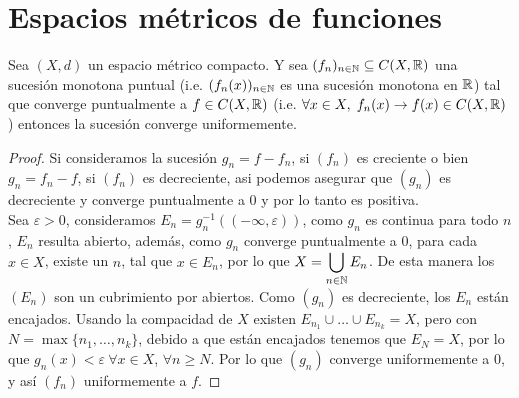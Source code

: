 \documentclass[12pt,a4paper]{book}
\begin{document}
\section{Espacios métricos de funciones}
\begin{teo}
Sea $(X,d)$ un espacio métrico compacto. Y sea $(f_n)_{n\in  \mathbb{N}} \subseteq C(X,\mathbb{R})$ una sucesión monotona puntual (i.e. $(f_n(x))_{n \in \mathbb{N}}$ es una sucesión monotona en $\mathbb{R}$) tal que converge puntualmente a $f \in C(X,\mathbb{R})$ (i.e. $\forall x \in X, \; f_n(x)\rightarrow f(x) \in C(X,\mathbb{R})$) entonces la sucesión converge uniformemente.
\begin{proof}
Si consideramos la sucesión $ g_n = f - f_n$, si $(f_n)$ es creciente o bien $g_n = f_n - f$, si $(f_n)$ es decreciente, asi podemos asegurar que $(g_n)$ es decreciente y converge puntualmente a $0$ y por lo tanto es positiva.\\
Sea $\varepsilon > 0$, consideramos $E_n = g_n^{-1}((- \infty, \varepsilon))$, como $g_n$ es continua para todo $n$, $E_n$ resulta abierto, además, como $g_n$ converge puntualmente a 0, para cada $x\in X$, existe un $n$, tal que $x \in E_n$, por lo que $X = \displaystyle \bigcup_{n \in \mathbb{N}}
 E_n$.
 De esta manera los $(E_n)$ son un cubrimiento por abiertos. Como $(g_n)$ es decreciente, los $E_n$ están encajados. Usando la compacidad de $X$
  existen $E_{n_1} \cup \ldots \cup E_{n_k} = X$, pero con $N = \max \{n_1, \ldots , n_k \}$, debido a que están encajados tenemos que $E_N = X$,
   por lo que $ g_n(x) < \varepsilon \: \forall x \in X $, $\forall n \geq N$. Por lo que $(g_n)$ converge uniformemente a 0, y así $(f_n)$ uniformemente a $f$.
\end{proof}
\end{teo}
\end{document}
